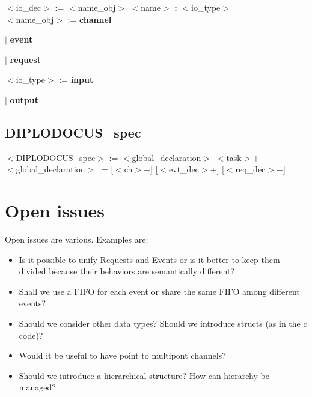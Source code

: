\documentclass[12pt]{article}
\begin{document}
\begin{onecolumn}
\indent $<$io\_dec$>$ := $<$name\_obj$>$ $<$name$>$ \textbf{:} $<$io\_type$>$\\

\indent \indent $<$name\_obj$>$ := \textbf{channel}

\indent \indent \indent \indent \indent \indent $|$ \textbf{event}

\indent \indent \indent \indent \indent \indent $|$ \textbf{request}

\indent \indent $<$io\_type$>$ := \textbf{input}

\indent \indent \indent \indent \indent \indent $|$ \textbf{output}


\subsection{DIPLODOCUS\_spec}

\noindent $<$DIPLODOCUS\_spec$>$ := $<$global\_declaration$>$ $<$task$>$$+$\\

$<$global\_declaration$>$ := [$<$ch$>$$+$] [$<$evt\_dec$>$$+$] [$<$req\_dec$>$$+$]



\newpage




\section{Open issues}

Open issues are various. Examples are:\\
\begin{itemize}
	\item Is it possible to unify Requests and Events or is it better to keep them divided because their behaviors are semantically different?\\
	
	\item Shall we use a FIFO for each event or share the same FIFO among different events?\\
	
	\item Should we consider other data types? Should we introduce structs (as in the c code)?\\
	
	\item Would it be useful to have point to multipont channels?\\
	
	\item Should we introduce a hierarchical structure? How can hierarchy be managed?\\
	

\end{itemize}
\end{onecolumn}
\end{document}
